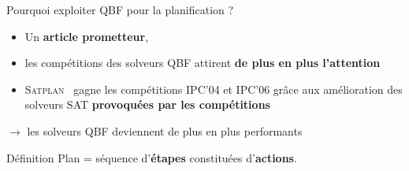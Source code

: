 \documentclass[english,french,usenames,dvipsnames]{beamer}
\begin{document}
\begin{frame}
Pourquoi exploiter QBF pour la planification ?
\begin{itemize}
\item Un \textbf{article prometteur}, \cite{DBLP:conf/ecai/CashmoreFG12}
\item les compétitions des solveurs QBF attirent \textbf{de plus en plus l'attention}
\item \textsc{Satplan}~ gagne les compétitions IPC'04 et IPC'06 \nocite{KAU04,KSH06} grâce aux amélioration des solveurs SAT \textbf{provoquées par les compétitions}
\end{itemize}

\begin{center}
$\longrightarrow$ les solveurs QBF deviennent de plus en plus performants
\end{center}
\end{frame}

\begin{frame}{\subsecname}
\begin{block}{Définition}
Plan = séquence d'\textbf{étapes} constituées d'\textbf{actions}.
\end{block}
\end{frame}
\end{document}
